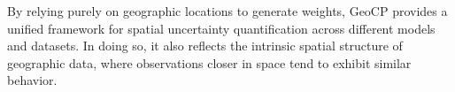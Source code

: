\documentclass[authoryear,preprint,review,12pt]{elsarticle}
\begin{document}

By relying purely on geographic locations to generate weights, GeoCP provides a unified framework for spatial uncertainty quantification across different models and datasets. In doing so, it also reflects the intrinsic spatial structure of geographic data, where observations closer in space tend to exhibit similar behavior.






\end{document}
